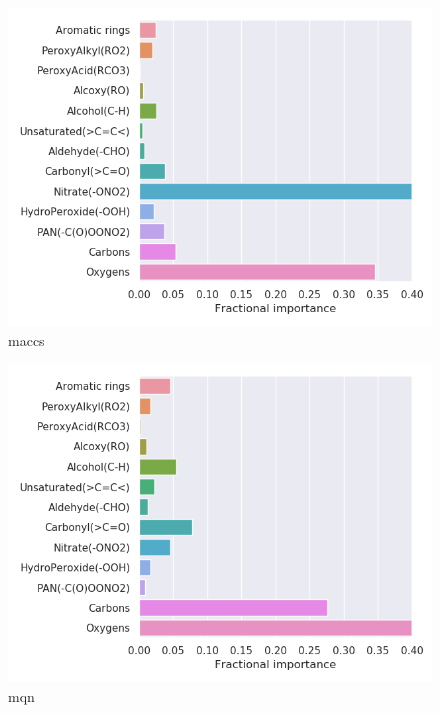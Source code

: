 \begin{subfigure}[b]{0.46\textwidth}
    \centering
    \includegraphics[width=\textwidth]{outputs/PCA/maccs/legend.png}
    \caption{maccs}
    \label{fig:legend_PCA_maccs}
\end{subfigure}
\begin{subfigure}[b]{0.46\textwidth}
    \centering
    \includegraphics[width=\textwidth]{outputs/PCA/mqn/legend.png}
    \caption{mqn}
    \label{fig:legend_PCA_mqn}
\end{subfigure}\\
